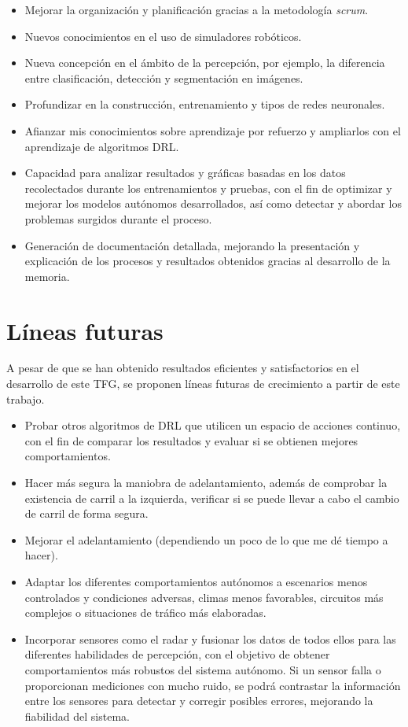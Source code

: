 \begin{itemize}
  \item Mejorar la organización y planificación gracias a la metodología \textit{scrum}.
  \item Nuevos conocimientos en el uso de simuladores robóticos.
  \item Nueva concepción en el ámbito de la percepción, por ejemplo, la diferencia entre clasificación, detección y segmentación en imágenes.
  \item Profundizar en la construcción, entrenamiento y tipos de redes neuronales.
  \item Afianzar mis conocimientos sobre aprendizaje por refuerzo y ampliarlos con el aprendizaje de algoritmos \ac{DRL}.
  \item Capacidad para analizar resultados y gráficas basadas en los datos recolectados durante los entrenamientos y pruebas, con el fin de optimizar y mejorar los modelos autónomos desarrollados, así como detectar y abordar los problemas surgidos durante el proceso.
  \item Generación de documentación detallada, mejorando la presentación y explicación de los procesos y resultados obtenidos gracias al desarrollo de la memoria.
\end{itemize}


\section{Líneas futuras}

A pesar de que se han obtenido resultados eficientes y satisfactorios en el desarrollo de este \ac{TFG}, se proponen líneas futuras de crecimiento a partir de este trabajo. 
\begin{itemize}
    \item Probar otros algoritmos de \ac{DRL} que utilicen un espacio de acciones continuo, con el fin de comparar los resultados y evaluar si se obtienen mejores comportamientos.
    \item Hacer más segura la maniobra de adelantamiento, además de comprobar la existencia de carril a la izquierda, verificar si se puede llevar a cabo el cambio de carril de forma segura.
    \item Mejorar el adelantamiento (dependiendo un poco de lo que me dé tiempo a hacer).
    \item Adaptar los diferentes comportamientos autónomos a escenarios menos controlados y condiciones adversas, climas menos favorables, circuitos más complejos o situaciones de tráfico más elaboradas.
	\item Incorporar sensores como el radar y fusionar los datos de todos ellos para las diferentes habilidades de percepción, con el objetivo de obtener comportamientos más robustos del sistema autónomo. Si un sensor falla o proporcionan mediciones con mucho ruido, se podrá contrastar la información entre los sensores para detectar y corregir posibles errores, mejorando la fiabilidad del sistema.
\end{itemize}
